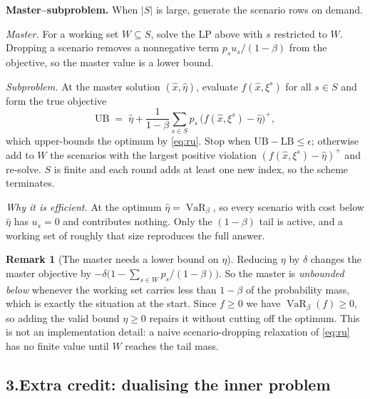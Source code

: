 \documentclass[11pt]{article}
\DeclareMathOperator{\VaR}{VaR}
\theoremstyle{definition}
\newtheorem{remark}{Remark}
\begin{document}
\textbf{Master--subproblem.} When $|S|$ is large, generate the scenario
rows on demand.

\emph{Master.} For a working set $W \subseteq S$, solve the LP above with
$s$ restricted to $W$. Dropping a scenario removes a nonnegative term
$p_s u_s/(1-\beta)$ from the objective, so the master value is a lower
bound.

\emph{Subproblem.} At the master solution $(\hat x, \hat\eta)$, evaluate
$f(\hat x, \xi^{s})$ for all $s \in S$ and form the true objective
\[
  \mathrm{UB} \;=\; \hat\eta + \frac{1}{1-\beta}
    \sum_{s \in S} p_s\,\big(f(\hat x,\xi^{s}) - \hat\eta\big)^{+},
\]
which upper-bounds the optimum by \eqref{eq:ru}. Stop when
$\mathrm{UB} - \mathrm{LB} \le \epsilon$; otherwise add to $W$ the
scenarios with the largest positive violation
$(f(\hat x,\xi^{s}) - \hat\eta)^{+}$ and re-solve. $S$ is finite and each
round adds at least one new index, so the scheme terminates.

\emph{Why it is efficient.} At the optimum $\hat\eta = \VaR_\beta$, so
every scenario with cost below $\hat\eta$ has $u_s = 0$ and contributes
nothing. Only the $(1-\beta)$ tail is active, and a working set of roughly
that size reproduces the full answer.

\begin{remark}[The master needs a lower bound on $\eta$]
\label{rem:unbdd}
Reducing $\eta$ by $\delta$ changes the master objective by
$-\delta\big(1 - \sum_{s\in W} p_s/(1-\beta)\big)$. So the master is
\emph{unbounded below} whenever the working set carries less than
$1-\beta$ of the probability mass, which is exactly the situation at the
start. Since $f \ge 0$ we have $\VaR_\beta(f) \ge 0$, so adding the valid
bound $\eta \ge 0$ repairs it without cutting off the optimum. This is not
an implementation detail: a naive scenario-dropping relaxation of
\eqref{eq:ru} has no finite value until $W$ reaches the tail mass.
\end{remark}

\subsection*{3.\quad Extra credit: dualising the inner problem}
\end{document}

